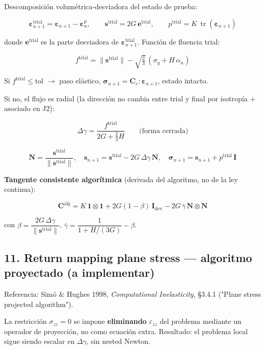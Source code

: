 \documentclass[11pt,letterpaper,oneside]{report}
\begin{document}
Descomposición volumétrica-desviadora del estado de prueba:

\[
\boldsymbol\varepsilon^{\text{trial}}_{n+1} = \boldsymbol\varepsilon_{n+1} - \boldsymbol\varepsilon^p_n, \qquad \mathbf s^{\text{trial}} = 2G\,\mathbf e^{\text{trial}}, \qquad p^{\text{trial}} = K\,\operatorname{tr}(\boldsymbol\varepsilon_{n+1})
\]

donde $\mathbf e^{\text{trial}}$ es la parte desviadora de $\boldsymbol\varepsilon^{\text{trial}}_{n+1}$. Función de fluencia trial:

\[
f^{\text{trial}} = \|\mathbf s^{\text{trial}}\| - \sqrt{\tfrac{2}{3}}\,(\sigma_y + H\,\alpha_n)
\]

Si $f^{\text{trial}} \leq \text{tol}$ \ensuremath{\to} paso elástico, $\boldsymbol\sigma_{n+1} = \mathbf C_e:\boldsymbol\varepsilon_{n+1}$, estado intacto.

Si no, el flujo es radial (la dirección no cambia entre trial y final por isotropía + asociado en J2):

\[
\Delta\gamma = \frac{f^{\text{trial}}}{2G + \tfrac{2}{3}H} \qquad\text{(forma cerrada)}
\]

\[
\mathbf N = \frac{\mathbf s^{\text{trial}}}{\|\mathbf s^{\text{trial}}\|}, \quad \mathbf s_{n+1} = \mathbf s^{\text{trial}} - 2G\,\Delta\gamma\,\mathbf N, \quad \boldsymbol\sigma_{n+1} = \mathbf s_{n+1} + p^{\text{trial}}\,\mathbf I
\]

\textbf{Tangente consistente algorítmica} (derivada del algoritmo, no de la ley continua):

\[
\mathbf C^{\text{alg}} = K\,\mathbf 1\otimes\mathbf 1 + 2G(1-\beta)\,\mathbf I_{\text{dev}} - 2G\,\bar\gamma\,\mathbf N\otimes\mathbf N
\]

con $\beta = \dfrac{2G\,\Delta\gamma}{\|\mathbf s^{\text{trial}}\|}$, $\bar\gamma = \dfrac{1}{1 + H/(3G)} - \beta$.

\subsection{11. Return mapping plane stress --- \textbf{algoritmo proyectado} (a implementar)}

Referencia: Simó \& Hughes 1998, \textit{Computational Inelasticity}, §3.4.1 ("Plane stress projected algorithm").

La restricción $\sigma_{zz} = 0$ se impone \textbf{eliminando} $\varepsilon_{zz}$ del problema mediante un operador de proyección, no como ecuación extra. Resultado: el problema local sigue siendo escalar en $\Delta\gamma$, sin nested Newton.
\end{document}
